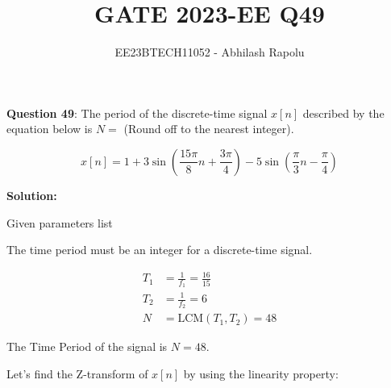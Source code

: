 \documentclass[journal,12pt,twocolumn]{IEEEtran}
\title{GATE 2023-EE Q49}
\author{EE23BTECH11052 - Abhilash Rapolu}
\begin{document}
\maketitle

\newpage

\textbf{Question 49}: The period of the discrete-time signal \(x[n]\) described by the equation below is \(N = \) (Round off to the nearest integer).

\[
x[n] = 1 + 3\sin\left(\frac{15\pi}{8}n + \frac{3\pi}{4}\right) - 5\sin\left(\frac{\pi}{3}n - \frac{\pi}{4}\right)
\]

\textbf{Solution:}

\begin{table}[htbp]
\centering

\caption{Given parameters list}
\end{table}

The time period must be an integer for a discrete-time signal.

\begin{align}
T_1 &= \frac{1}{f_1} = \frac{16}{15} \\
T_2 &= \frac{1}{f_2} = 6 \\
N &= \text{LCM}(T_1, T_2) = 48
\end{align}

The Time Period of the signal is \(N = 48\).

Let's find the Z-transform of \(x[n]\) by using the linearity property:
\end{document}
